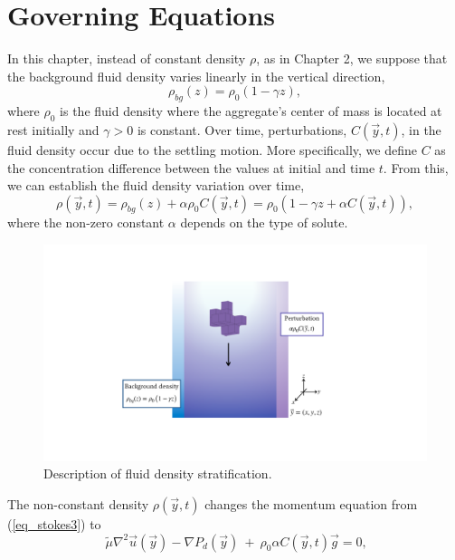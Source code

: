 \section{Governing Equations}
In this chapter, instead of constant density $\rho$, as in Chapter 2, we suppose that the background fluid density varies linearly in the vertical direction,
\begin{equation}
\rho_{bg}(z) =  \rho_0 \left(1 - \gamma z \right),
\label{eq_rho_bg}
\end{equation}
where $\rho_0$ is the fluid density where the aggregate's center of mass is located at rest initially and $\gamma > 0$ is constant.
Over time, perturbations, $C(\vec{y},t)$, in the fluid density occur due to the settling motion. More specifically, we define $C$ as the concentration difference between the values at initial and time $t$.
From this, we can establish the fluid density variation over time,
\begin{equation}
	\rho(\vec{y},t ) 
	= \rho_{bg}(z) +  \alpha \rho_0 C(\vec{y},t) 
	 = \rho_0 \left( 1 - \gamma z  + \alpha  C(\vec{y},t) \right),
\label{eq_density}
\end{equation}
where the non-zero constant $\alpha$ depends on the type of solute. 
\begin{figure}[ht]
	\begin{center}
	\includegraphics[scale=0.4]{./figures/fig_stratification_schematics}
	\caption{Description of fluid density stratification.}
	\label{fig_stratification_schematics}
	\end{center}
\end{figure}
The non-constant density $\rho(\vec{y},t)$ changes the momentum equation from (\ref{eq_stokes3}) to 
		 \begin{equation}
		\ \tilde{\mu}\nabla^2 \vec{u}(\vec{y})
		- \nabla P_d (\vec{y}) \ + \  
		 \rho_0 \alpha C(\vec{y},t) \vec{g} =0 , 
	\label{eq_extra_C}
	\end{equation}
